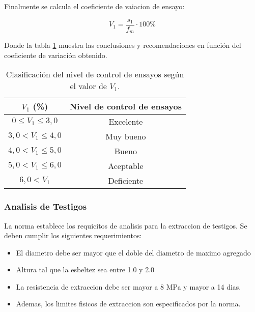 Finalmente se calcula el coeficiente de vaiacion de ensayo:

\begin{equation}
    V_1 = \frac{s_1}{f_m} \cdot 100\%
\end{equation}

Donde la tabla \ref{tab:conclusiones3} muestra las conclusiones y recomendaciones en función del coeficiente de variación obtenido.

\begin{table}[H]
\centering
\begin{tabular}{|c|c|}
\hline
\textbf{$V_{1}$ (\%)} & \textbf{Nivel de control de ensayos} \\ \hline
$0 \leq V_{1} \leq 3,0$ & Excelente \\ \hline
$3,0 < V_{1} \leq 4,0$ & Muy bueno \\ \hline
$4,0 < V_{1} \leq 5,0$ & Bueno \\ \hline
$5,0 < V_{1} \leq 6,0$ & Aceptable \\ \hline
$6,0 < V_{1}$ & Deficiente \\ \hline
\end{tabular}
\caption{Clasificación del nivel de control de ensayos según el valor de $V_{1}$.}
\label{tab:conclusiones3}
\end{table}


\subsubsection{Analisis de Testigos}

La norma \cite{NCh1171-1-2001} establece los requicitos de analisis para la extraccion de testigos. Se deben cumplir los siguientes requerimientos:

\begin{itemize}
    \item El diametro debe ser mayor que el doble del diametro de maximo agregado
    \item Altura tal que la esbeltez sea entre 1.0 y 2.0
    \item La resistencia de extraccion debe ser mayor a 8 MPa y mayor a 14 dias.
    \item Ademas, los limites fisicos de extraccion son especificados por la norma.
\end{itemize}












